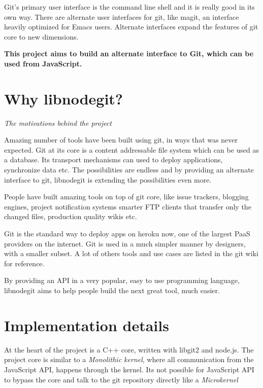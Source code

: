 Git's primary user interface is the command line shell and it is really good in
its own way. There are alternate user interfaces for git, like
magit\cite{magit}, an interface heavily optimized for Emacs\cite{emacs} users.
Alternate interfaces expand the features of git core to new dimensions.

\textbf{This project aims to build an alternate interface to Git, which can be
  used from JavaScript.}

\section{Why libnodegit?}

\newcommand\sectionTitle[1]{\begin{flushright}\textit{#1}\end{flushright}}
\sectionTitle{The motivations behind the project}

Amazing number of tools have been built using git, in ways that was never
expected. Git at its core is a content addressable file system which can be used
as a database. Its transport mechanisms can used to deploy applications,
synchronize data etc. The possibilities are endless and by providing an
alternate interface to git, libnodegit is extending the possibilities even more.

People have built amazing tools on top of git core, like issue
trackers\cite{gaskit}, blogging engines\cite{octopress}, project notification
systems\cite{git-dude} smarter FTP clients\cite{git-ftp} that transfer only the
changed files, production quality\cite{gollum-imporoved} wikis\cite{gollum} etc.

Git is the standard way to deploy apps on heroku\cite{git-heroku} now, one of
the largest PaaS\cite{PaaS} providers on the internet. Git is used in a much
simpler manner by designers\cite{git-designers}, with a smaller subset. A lot of
others tools and use cases are listed in the git wiki\cite{git-tools} for
reference.

By providing an API in a very popular, easy to use programming language,
libnodegit aims to help people build the next great tool, much easier.

\section{Implementation details}

At the heart of the project is a C++ core, written with libgit2\cite{libgit2}
and node.js\cite{node}. The project core is similar to a \textit{Monolithic
  kernel}\cite{monolithic-kernel}, where all communication from the JavaScript
API, happens through the kernel. Its not possible for JavaScript API to bypass
the core and talk to the git repository directly like a
\textit{Microkernel}\cite{microkernel}

